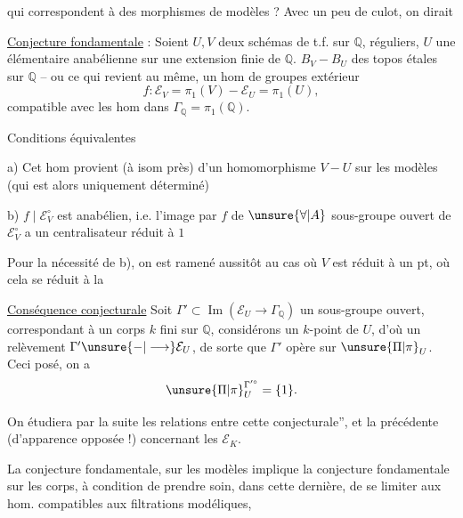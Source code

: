 qui correspondent à des morphismes de modèles ? Avec un peu de culot, on dirait

\uline{Conjecture fondamentale} : Soient $U,V$ deux schémas de t.f. sur $\mathbb{Q}$,  réguliers, $U$ une   élémentaire anabélienne sur une extension finie de $\mathbb{Q}$.     $B_V-B_U$ des topos étales sur $\mathbb{Q}$ -- ou ce qui revient au même, un hom de groupes extérieur
\[
f:\mathcal E_V=\pi_1(V)-\mathcal E_U=\pi_1(U),
\]
compatible avec les hom dans $\Gamma_{\mathbb{Q}}=\pi_1(\mathbb{Q})$.

Conditions équivalentes

 a) Cet hom provient (à isom près) d'un homomorphisme $V-U$ sur les modèles (qui est alors uniquement déterminé)

 b) $f\mid\mathcal E_V^\circ$ est anabélien, i.e. l'image par $f$ de $\unsure{\forall|A}$ sous-groupe ouvert de $\mathcal E_V^\circ$ a un centralisateur réduit à $1$

Pour la nécessité de b), on est ramené aussitôt au cas où $V$ est réduit à un pt, où cela se réduit à la 

\uline{Conséquence conjecturale} Soit $\Gamma'\subset\operatorname{Im}(\mathcal E_U\longrightarrow\Gamma_{\mathbb{Q}})$ un sous-groupe ouvert, correspondant à un corps $k$ fini sur $\mathbb{Q}$, considérons un $k$-point de $U$, d'où un relèvement $\Gamma'\unsure{-|\longrightarrow}\mathcal E_U$, de sorte que $\Gamma'$ opère sur $\unsure{\Pi|\pi}_U$. Ceci posé, on a
\[
\unsure{\Pi|\pi}_U^{\Gamma'^\circ}=\{1\}.
\]

On étudiera par la suite les relations entre cette  conjecturale'', et la précédente (d'apparence opposée !) concernant les $\mathcal E_K$.

La conjecture fondamentale, sur les modèles implique la conjecture fondamentale sur les corps, à condition de prendre soin, dans cette dernière, de se limiter aux hom. compatibles aux filtrations modéliques,

